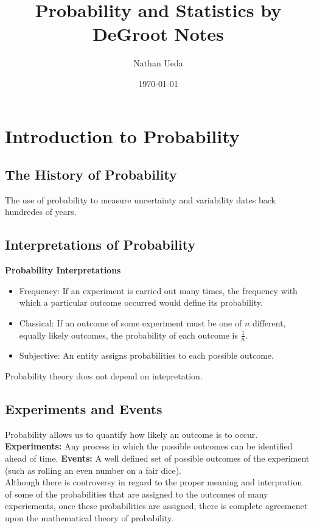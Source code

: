 \documentclass[11pt]{article}
\title{Probability and Statistics by DeGroot Notes}
\author{Nathan Ueda}
\date{\today}
\begin{document}
\maketitle 
\pagebreak
\tableofcontents 
\pagebreak

\section{Introduction to Probability}
\subsection{The History of Probability}
The use of probability to measure uncertainty and variability dates back hundredes of years.

\subsection{Interpretations of Probability}

\textbf{Probability Interpretations}
\begin{itemize}
    \item Frequency: If an experiment is carried out many times, the frequency with which a
    particular outcome occurred would define its probability.
    \item Classical: If an outcome of some experiment must be one of $n$ different, equally
    likely outcomes, the probability of each outcome is $\frac{1}{n}$.
    \item Subjective: An entity assigns probabilities to each possible outcome.
\end{itemize}

Probability theory does not depend on intepretation.

\subsection{Experiments and Events}

Probability allows us to quantify how likely an outcome is to occur. \\

\textbf{Experiments:} Any process in which the possible outcomes can be identified ahead of time.
\textbf{Events:} A well defined set of possible outcomes of the experiment (such as rolling an 
even number on a fair dice). \\

Although there is controversy in regard to the proper meaning and interpration of some of the
probabilities that are assigned to the outcomes of many experiements, once these probabilities
are assigned, there is complete agreemenet upon the mathematical theory of probability. \\
\end{document}
